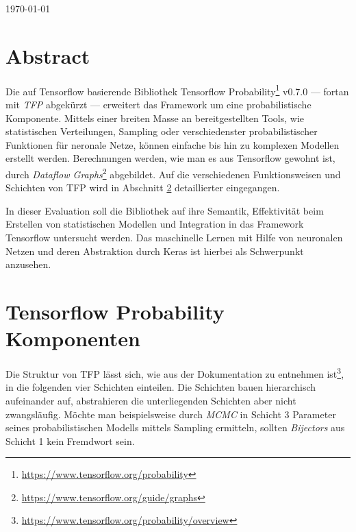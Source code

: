 \documentclass[12pt]{article}
\begin{document}
\begin{titlepage}
\begin{center}

\vspace{\fill} %

{\large \today}\\[3cm] %

\end{center}

\end{titlepage}



\tableofcontents

\newpage


\section{Abstract}
\label{abstract}
Die auf Tensorflow basierende Bibliothek Tensorflow Probability\footnote{\url{https://www.tensorflow.org/probability}} v0.7.0 --- fortan mit \textit{TFP} abgekürzt --- erweitert das Framework um eine probabilistische Komponente.
Mittels einer breiten Masse an bereitgestellten Tools, wie statistischen Verteilungen, Sampling oder verschiedenster probabilistischer Funktionen für neronale Netze, können einfache bis hin zu komplexen Modellen erstellt werden. Berechnungen werden, wie man es aus Tensorflow gewohnt ist, durch \textit{Dataflow Graphs}\footnote{\url{https://www.tensorflow.org/guide/graphs}} abgebildet. Auf die verschiedenen Funktionsweisen und Schichten von TFP wird in Abschnitt \ref{sec:tfp-components} detaillierter eingegangen.

In dieser Evaluation soll die Bibliothek auf ihre Semantik, Effektivität beim Erstellen von statistischen Modellen und Integration in das Framework Tensorflow untersucht werden. Das maschinelle Lernen mit Hilfe von neuronalen Netzen und deren Abstraktion durch Keras ist hierbei als Schwerpunkt anzusehen.

\section{Tensorflow Probability Komponenten}
\label{sec:tfp-components}
Die Struktur von TFP lässt sich, wie aus der Dokumentation zu entnehmen ist\footnote{\url{https://www.tensorflow.org/probability/overview}}, in die folgenden vier Schichten einteilen. Die Schichten bauen hierarchisch aufeinander auf, abstrahieren die unterliegenden Schichten aber nicht zwangsläufig. Möchte man beispielsweise durch \textit{MCMC} in Schicht 3 Parameter seines probabilistischen Modells mittels Sampling ermitteln, sollten \textit{Bijectors} aus Schicht 1 kein Fremdwort sein.
\end{document}
